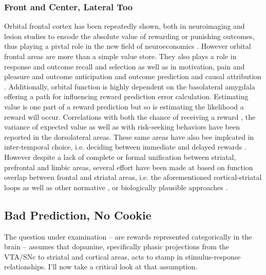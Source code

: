 \documentclass[doc,12pt]{apa}        %
\begin{document}
\subsubsection{Front and Center, Lateral Too}
\label{sub:f_and_c}
Orbital frontal cortex has been repeatedly shown, both in neuroimaging \cite{ODoherty:2001p2423} and lesion \cite{Hornak:2004p6234} studies to encode the absolute value of rewarding or punishing outcomes, thus playing a pivtal role in the new field of neuroeconomics \cite{Glimcher:2005p863}. However orbital frontal areas are more than a simple value store.  They also plays a role in response and outcome recall \cite{Furuyashiki:2008p1631} and selection \cite{Rudebeck:2008p4712} as well as in motivation, pain and pleasure \cite{Atlas:2010p7566} and outcome anticipation \cite{Roesch:2007p7182} and outcome prediction \cite{Tanaka:2006fk} and causal attribution \cite{Tanaka:2008p3265}.  Additionally, orbital function is highly dependent on the basolateral amygdala \cite{ODoherty:2003p2616} offering a path for influencing reward prediction error calculation.  Estimating value is one part of a reward prediction but so is estimating the likelihood a reward will occur.  Correlations with both the chance of receiving a reward \cite{Tobler:2009p8297}, the variance of expected value \cite{Kahnt:2010p7677} as well as with risk-seeking behaviors \cite{Tobler:2007p1562} have been reported in the dorsolateral areas. These same areas have also bee implcated in inter-temporal choice, i.e. deciding between immediate and delayed rewards \cite{Kim:2009p8304,Kim:2008p2984}.  However despite a lack of complete or formal unification between striatal, prefrontal and limbic areas, several effort have been made at based on function overlap between frontal and striatal areas, i.e. the aforementioned cortical-striatal loops \cite{Frank:2011p8152, Seger:2010p7189, Frank:2001p1996, Ashby:2007p8986} as well as other normative \cite{BarGad:2003p4052, Botvinick:2008p6594}, or biologically plausible approaches \cite{Bogacz:2007p753}.

\subsection{Bad Prediction, No Cookie}
\label{sub:wrong}
The question under examination -- are rewards represented categorically in the brain -- assumes that dopamine, specifically phasic projections from the VTA/SNc to striatal and cortical areas, acts to stamp in stimulus-response relationships.  I'll now take a critical look at that assumption.
\end{document}
